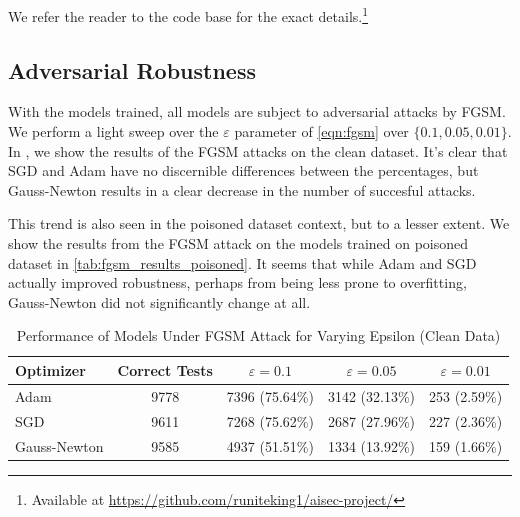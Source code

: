 \documentclass{article}
\begin{document}
    We refer the reader to the code base for the exact details.\footnote{Available at \url{https://github.com/runiteking1/aisec-project/}}


    \subsection{Adversarial Robustness}
    With the models trained, all models are subject to adversarial attacks by FGSM.
    We perform a light sweep over the $\varepsilon$ parameter of \cref{eqn:fgsm} over $\{0.1, 0.05, 0.01\}$.
    In , we show the results of the FGSM attacks on the clean dataset.
    It's clear that SGD and Adam have no discernible differences between the percentages, but Gauss-Newton results in a clear decrease in the number of succesful attacks.

    This trend is also seen in the poisoned dataset context, but to a lesser extent.
    We show the results from the FGSM attack on the models trained on poisoned dataset in \cref{tab:fgsm_results_poisoned}.
    It seems that while Adam and SGD actually improved robustness, perhaps from being less prone to overfitting, Gauss-Newton did not significantly change at all.


    \begin{table}[ht!]
        \centering
        \caption{Performance of Models Under FGSM Attack for Varying Epsilon (Clean Data)}
        \label{tab:fgsm_results}
        \begin{tabular}{|l|c|c|c|c|}
            \hline
            \textbf{Optimizer} & \textbf{Correct Tests} & $\varepsilon=0.1$ & $\varepsilon=0.05$ & $\varepsilon=0.01$ \\
            \hline
            Adam               & 9778                   & 7396 (75.64\%)    & 3142 (32.13\%)     & 253 (2.59\%)       \\
            \hline
            SGD                & 9611                   & 7268 (75.62\%)    & 2687 (27.96\%)     & 227 (2.36\%)       \\
            \hline
            Gauss-Newton       & 9585                   & 4937 (51.51\%)    & 1334 (13.92\%)     & 159 (1.66\%)       \\
            \hline
        \end{tabular}
    \end{table}
\end{document}
